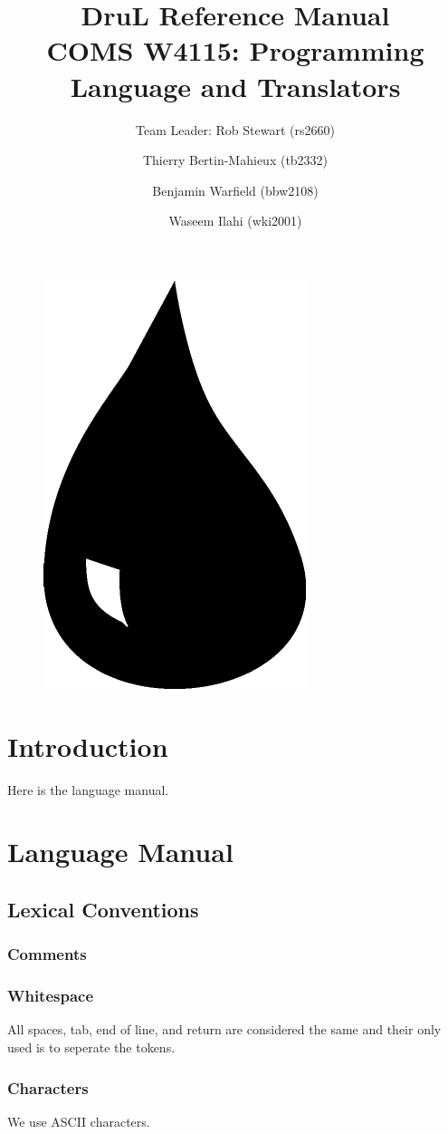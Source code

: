 \documentclass[11pt,twoside]{article}
\title{\textbf{DruL} Reference Manual\\
\vspace{1cm}
COMS W4115: Programming Language and Translators}
\author{Team Leader: Rob Stewart (rs2660) \and Thierry Bertin-Mahieux (tb2332) \and Benjamin Warfield (bbw2108) \and Waseem Ilahi (wki2001)}
\begin{document}
\maketitle
\begin{center}
\end{center}

\vspace{3cm}

\begin{figure}[h]
\begin{center}
\includegraphics[width=.2\columnwidth]{Water_Drop.pdf}
\end{center}
\end{figure}


\newpage


\section{Introduction}
Here is the language manual.


\section{Language Manual}

\subsection{Lexical Conventions}

\subsubsection{Comments}

\subsubsection{Whitespace}
All spaces, tab, end of line, and return are considered the same 
and their only used is to seperate the tokens.

\subsubsection{Characters}
We use ASCII characters.
\end{document}
